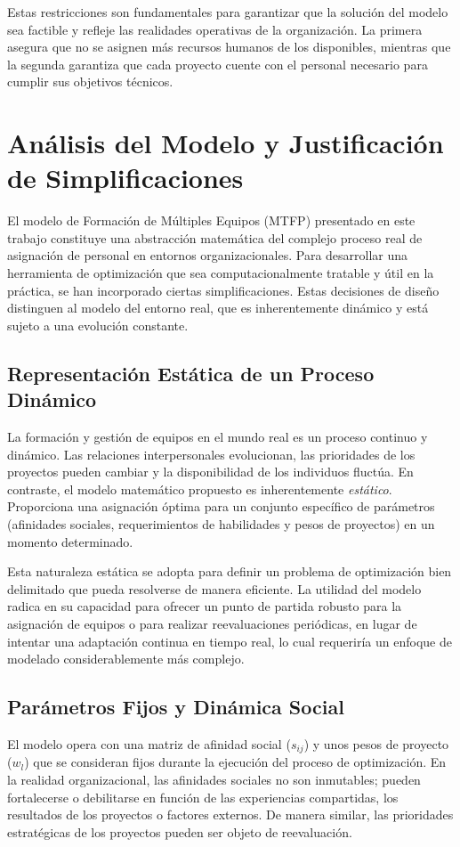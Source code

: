 \documentclass[conference]{IEEEtran}
\begin{document}
Estas restricciones son fundamentales para garantizar que la solución del modelo sea factible y refleje las realidades operativas de la organización. La primera asegura que no se asignen más recursos humanos de los disponibles, mientras que la segunda garantiza que cada proyecto cuente con el personal necesario para cumplir sus objetivos técnicos.



\section{Análisis del Modelo y Justificación de Simplificaciones}

El modelo de Formación de Múltiples Equipos (MTFP) presentado en este trabajo constituye una abstracción matemática del complejo proceso real de asignación de personal en entornos organizacionales. Para desarrollar una herramienta de optimización que sea computacionalmente tratable y útil en la práctica, se han incorporado ciertas simplificaciones. Estas decisiones de diseño distinguen al modelo del entorno real, que es inherentemente dinámico y está sujeto a una evolución constante.

\subsection{Representación Estática de un Proceso Dinámico}
La formación y gestión de equipos en el mundo real es un proceso continuo y dinámico. Las relaciones interpersonales evolucionan, las prioridades de los proyectos pueden cambiar y la disponibilidad de los individuos fluctúa. En contraste, el modelo matemático propuesto es inherentemente \textit{estático}. Proporciona una asignación óptima para un conjunto específico de parámetros (afinidades sociales, requerimientos de habilidades y pesos de proyectos) en un momento determinado.

Esta naturaleza estática se adopta para definir un problema de optimización bien delimitado que pueda resolverse de manera eficiente. La utilidad del modelo radica en su capacidad para ofrecer un punto de partida robusto para la asignación de equipos o para realizar reevaluaciones periódicas, en lugar de intentar una adaptación continua en tiempo real, lo cual requeriría un enfoque de modelado considerablemente más complejo.

\subsection{Parámetros Fijos y Dinámica Social}
El modelo opera con una matriz de afinidad social ($s_{ij}$) y unos pesos de proyecto ($w_l$) que se consideran fijos durante la ejecución del proceso de optimización. En la realidad organizacional, las afinidades sociales no son inmutables; pueden fortalecerse o debilitarse en función de las experiencias compartidas, los resultados de los proyectos o factores externos. De manera similar, las prioridades estratégicas de los proyectos pueden ser objeto de reevaluación.
\end{document}
